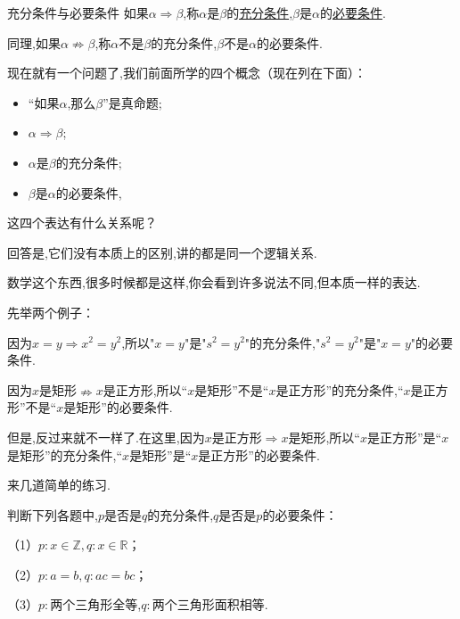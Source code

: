 \documentclass[lang=cn,math=cm,chinesefont=nofont,11pt,scheme=chinese,twocol]{elegantbook}
\begin{document}
\begin{definition}{充分条件与必要条件}
  如果$\alpha\Rightarrow\beta$,称$\alpha$是$\beta$的\underline{充分条件},$\beta$是$\alpha$的\underline{必要条件}.

  同理,如果$\alpha\nRightarrow\beta$,称$\alpha$不是$\beta$的充分条件,$\beta$不是$\alpha$的必要条件.
\end{definition}

现在就有一个问题了,我们前面所学的四个概念（现在列在下面）：
\begin{itemize}
  \item “如果$\alpha$,那么$\beta$”是真命题;
  \item $\alpha\Rightarrow\beta$;
  \item $\alpha$是$\beta$的充分条件;
  \item $\beta$是$\alpha$的必要条件,
\end{itemize}

这四个表达有什么关系呢？

回答是,它们没有本质上的区别,讲的都是同一个逻辑关系.

数学这个东西,很多时候都是这样,你会看到许多说法不同,但本质一样的表达.

\hspace*{\fill}

先举两个例子：

\begin{example}\label{202406262001}
  因为$x=y\Rightarrow x^2=y^2$,所以"$x=y$"是"$s^2=y^2$"的充分条件,"$s^2=y^2$"是"$x=y$"的必要条件.
\end{example}

\begin{example}\label{202406262002}
  因为$x$是矩形$\nRightarrow x$是正方形,所以“$x$是矩形”不是“$x$是正方形”的充分条件,“$x$是正方形”不是“$x$是矩形”的必要条件.

  但是,反过来就不一样了.在这里,因为$x$是正方形$\Rightarrow x$是矩形,所以“$x$是正方形”是“$x$是矩形”的充分条件,“$x$是矩形”是“$x$是正方形”的必要条件.
\end{example}

来几道简单的练习.

\begin{exercise}\label{202406262010}
  判断下列各题中,$p$是否是$q$的充分条件,$q$是否是$p$的必要条件：

  （1）$p:x\in\mathbb{Z},q:x\in\mathbb{R}$；

  （2）$p:a=b,q:ac=bc$；

  （3）$p:$两个三角形全等,$q:$两个三角形面积相等.
\end{exercise}
\end{document}
